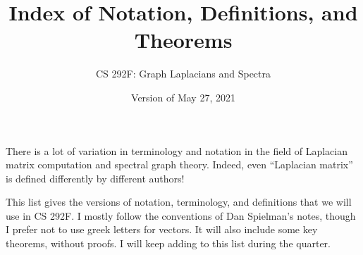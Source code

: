 \documentclass[11pt]{article}
\begin{document}
\title{Index of Notation, Definitions, and Theorems}
\author{CS 292F: Graph Laplacians and Spectra}
\date{Version of May 27, 2021}
\maketitle

There is a lot of variation in terminology and notation in
the field of Laplacian matrix computation and spectral graph 
theory.  
Indeed, even ``Laplacian matrix'' is defined differently by
different authors!

This list gives the versions of notation, terminology, and definitions 
that we will use in CS 292F.
I mostly follow the conventions of Dan Spielman's notes, 
though I prefer not to use greek letters for vectors.
It will also include some key theorems, without proofs.
I will keep adding to this list during the quarter.
\end{document}
